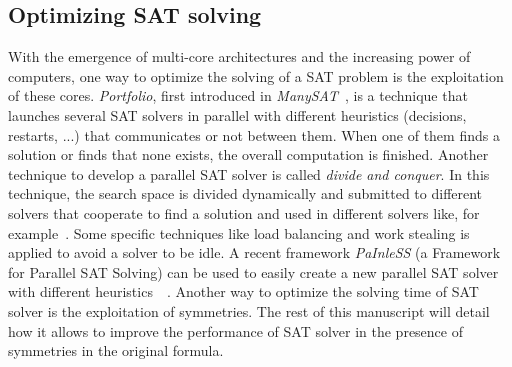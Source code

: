 \subsection{Optimizing SAT solving}
With the emergence of multi-core architectures and the increasing power of computers, one way to optimize the solving
of a SAT problem is the exploitation of these cores. %
\emph{Portfolio}, first introduced in \emph{ManySAT}~\cite{hamadi2008manysat}, is a technique that launches several SAT solvers in parallel with different heuristics (decisions, restarts, ...) that 
communicates or not between them. When one of them finds a solution or finds that none exists, the overall computation is finished.
Another technique to develop a parallel SAT solver is called \emph{divide and conquer}. In this technique,
the search space is divided  dynamically and submitted to different solvers that cooperate to find a solution and used in
different solvers like, for example~\cite{chu2008pminisat, lewis2007multithreaded}.
 Some specific techniques like load balancing and work stealing is applied to avoid a solver to be idle.
A recent framework \emph{PaInleSS} (a Framework for Parallel SAT Solving) can be used to easily create a new parallel 
SAT solver with different heuristics~\cite{le2017painless}~\cite{le2019modular}. 
Another way to optimize the solving time of SAT solver is the exploitation of symmetries. The rest of this manuscript will 
detail how it allows to improve the performance of SAT solver in the presence of symmetries in the original formula.
%
